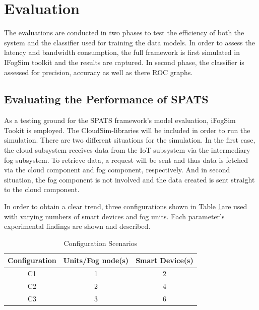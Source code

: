 \documentclass[10pt]{article}
\begin{document}
\section{Evaluation}
The evaluations are conducted in two phases to test the efficiency of both the system and the classifier used for training the data models. In order to assess the latency and bandwidth consumption, the full framework is first simulated in IFogSim toolkit and the results are captured. In second phase, the classifier is assessed for precision, accuracy as well as there ROC graphs.

\subsection{Evaluating the Performance of SPATS}
As a testing ground for the SPATS framework's model evaluation, iFogSim Tookit is employed. The CloudSim-libraries will be included in order to run the simulation. There are two different situations for the simulation. In the first case, the cloud subsystem receives data from the IoT subsystem via the intermediary fog subsystem. To retrieve data, a request will be sent and thus data is fetched via the cloud component and fog component, respectively. And in second situation, the fog component is not involved and the data created is sent straight to the cloud component. 

In order to obtain a clear trend, three configurations shown in Table \ref{table:4}are used with varying numbers of smart devices and fog units. Each parameter's experimental findings are shown and described.

\begin{table}[H]
\centering
\begin{tabular}{|c|c|c|}
\hline
\multicolumn{1}{|l|}{\textbf{Configuration}} & \multicolumn{1}{l|}{\textbf{Units/Fog node(s)}} & \multicolumn{1}{l|}{\textbf{Smart Device(s)}} \\ \hline
C1 & 1 & 2 \\ \hline
C2 & 2 & 4 \\ \hline
C3 & 3 & 6 \\ \hline
\end{tabular}
\caption{Configuration Scenarios \label{table:4}}
\end{table}
\end{document}
